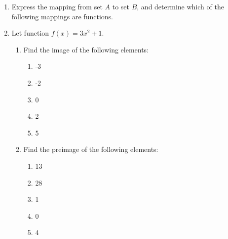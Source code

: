 \documentclass[12pt]{report}
\begin{document}
\begin{enumerate}
  \item Express the mapping from set $A$ to set $B$, and determine which of the
        following mappings are functions.


  \item Let function $f(x) = 3x^2 + 1$.
        \begin{enumerate}
          \item Find the image of the following elements:
                \begin{enumerate}
                  \item -3
                  \item -2
                  \item 0
                  \item 2
                  \item 5
                \end{enumerate}
          \item Find the preimage of the following elements:
                \begin{enumerate}
                  \item 13
                  \item 28
                  \item 1
                  \item 0
                  \item 4
                \end{enumerate}
        \end{enumerate}


\end{enumerate}
\end{document}
